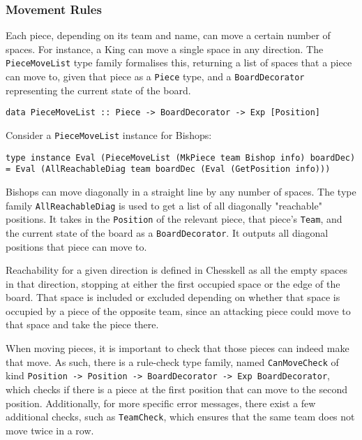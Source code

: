 \documentclass[12pt, a4paper, bibliography=totocnumbered]{scrreprt}
\newcommand{\inline}[1]{\lstinline[basicstyle=\ttfamily\footnotesize]{#1}}
\begin{document}
\subsubsection{Movement Rules}

Each piece, depending on its team and name, can move a certain number of spaces. For instance, a King can move a single space in any direction. The \inline{PieceMoveList} type family formalises this, returning a list of spaces that a piece can move to, given that piece as a \inline{Piece} type, and a \inline{BoardDecorator} representing the current state of the board.

\begin{lstlisting}
data PieceMoveList :: Piece -> BoardDecorator -> Exp [Position]
\end{lstlisting}

Consider a \inline{PieceMoveList} instance for Bishops:

\begin{lstlisting}
type instance Eval (PieceMoveList (MkPiece team Bishop info) boardDec) = Eval (AllReachableDiag team boardDec (Eval (GetPosition info)))
\end{lstlisting}

Bishops can move diagonally in a straight line by any number of spaces. The type family \inline{AllReachableDiag} is used to get a list of all diagonally "reachable" positions. It takes in the \inline{Position} of the relevant piece, that piece's \inline{Team}, and the current state of the board as a \inline{BoardDecorator}. It outputs all diagonal positions that piece can move to.

Reachability for a given direction is defined in Chesskell as all the empty spaces in that direction, stopping at either the first occupied space or the edge of the board. That space is included or excluded depending on whether that space is occupied by a piece of the opposite team, since an attacking piece could move to that space and take the piece there.

When moving pieces, it is important to check that those pieces can indeed make that move. As such, there is a rule-check type family, named \inline{CanMoveCheck} of kind \inline{Position -> Position -> BoardDecorator -> Exp BoardDecorator}, which checks if there is a piece at the first position that can move to the second position. Additionally, for more specific error messages, there exist a few additional checks, such as \inline{TeamCheck}, which ensures that the same team does not move twice in a row.
\end{document}
